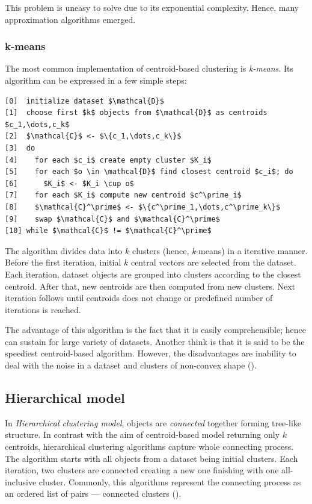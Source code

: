 This problem is uneasy to solve due to its exponential complexity. Hence, many approximation algorithms emerged. 

\subsubsection{k-means}

The most common implementation of centroid-based clustering is \emph{k-means}. Its algorithm can be expressed in a few simple steps:

\begin{Verbatim}[commandchars=\\\{\},codes={\catcode`$=3\catcode`^=7\catcode`_=8},frame=lines,label=$k$-means]
[0]  initialize dataset $\mathcal{D}$
[1]  choose first $k$ objects from $\mathcal{D}$ as centroids $c_1,\dots,c_k$ 
[2]  $\mathcal{C}$ <- $\{c_1,\dots,c_k\}$
[3]  do
[4]    for each $c_i$ create empty cluster $K_i$
[5]    for each $o \in \mathcal{D}$ find closest centroid $c_i$; do
[6]      $K_i$ <- $K_i \cup o$
[7]    for each $K_i$ compute new centroid $c^\prime_i$
[8]    $\mathcal{C}^\prime$ <- $\{c^\prime_1,\dots,c^\prime_k\}$
[9]    swap $\mathcal{C}$ and $\mathcal{C}^\prime$
[10] while $\mathcal{C}$ != $\mathcal{C}^\prime$
\end{Verbatim}

The algorithm divides data into $k$ clusters (hence, \emph{k}-means) in a iterative manner. Before the first iteration, initial $k$ central vectors are selected from the dataset. Each iteration, dataset objects are grouped into clusters according to the closest centroid. After that, new centroids are then computed from new clusters. Next iteration follows until centroids does not change or predefined number of iterations is reached. 

The advantage of this algorithm is the fact that it is easily comprehensible; hence can sustain for large variety of datasets. Another think is that it is said to be the speediest centroid-based algorithm. However, the disadvantages are inability to deal with the noise in a dataset and clusters of non-convex shape (\cite{uppada2014centroid}).
  

\subsection{Hierarchical model}

In \emph{Hierarchical clustering model}, objects are \emph{connected} together forming tree-like structure. In contrast with the aim of centroid-based model returning only $k$ centroids, hierarchical clustering algorithms capture whole connecting process. The algorithm starts with all objects from a dataset being initial clusters. Each iteration, two clusters are connected creating a new one finishing with one all-inclusive cluster. Commonly, this algorithms represent the connecting process as an ordered list of pairs --- connected clusters (\cite{karypis1999chameleon}).

